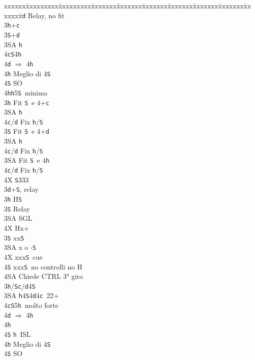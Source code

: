 \documentclass[a4paper,italian]{article}
\newcommand{\BS}{\small{\texttt{S}}}
\newcommand{\BC}{\small{\texttt{c}}}
\newcommand{\BD}{\small{\texttt{d}}}
\newcommand{\BH}{\small{\texttt{h}}}
\newenvironment{bidtable}
{\begin{tabbing}

    xxxxxx\=xxxxxxxxx\=xxxxxxxxx\=xxxxxxx\=xxxxxxx\=xxxxxxx\=xxxxxxx\=xxxxxxx\=xxxxxxx\=xxxxxxx\=\kill}
{\end{tabbing} }%
\begin{document}
\begin{multicols}{2}
\begin{bidtable}
        3\BD \> Relay, no fit\+\\
        3\BH {}+\BC \\
        3\BS {}+\BD \\
        3\small{SA} \BH \\
        4\BC {}\BS 4\BH\+\\
        4\BD \> $\Rightarrow$ 4\BH\\
        4\BH \> Meglio di 4\BS\\
        4\BS \> SO\-\\
        4\BH {}\BH 5\BS\ minima\-\\
        3\BH \> Fit \BS\ e 4+\BC \+\\
        3\small{SA} \BH \+\\
        4\BC/\BD \> Fix \BH/\BS\-\-\\
        3\BS \> Fit \BS\ e 4+\BD \+\\
        3\small{SA} \BH \+\\
        4\BC/\BD \> Fix \BH/\BS\-\-\\
        3\small{SA} \> Fit \BS\ e 4\BH \+\\
        4\BC/\BD \> Fix \BH/\BS\-\\
        4X \BS 333\-\\
        3\BD {}+\BS , relay\+\\
        3\BH \> H\BS \+\\
        3\BS \> Relay\+\\
        3\small{SA} \> SGL\\
        4X \> Hx+\-\-\\
        3\BS \> xx\BS \\
        3\small{SA} \> x o -\BS \\
        4X \> xxx\BS\ cue\\
        4\BS \> xxx\BS\ no controlli no H\+\\
        4\small{SA} \> Chiede CTRL 3° giro\-\-\\
        3\BH/\BS {}\BC /\BD 4\BS \\
        3\small{SA} \BH 4\BS 4\BD 4\BC\ 22+\\
        4\BC {}\BS 5\BH\ molto forte\+\\
        4\BD \> $\Rightarrow$ 4\BH \+\\
        4\BH\+\\
        4\BS \> \BH\ ISL\-\-\\
        4\BH \> Meglio di 4\BS \\
        4\BS \> SO
    \end{bidtable}

\end{multicols}
\end{document}
